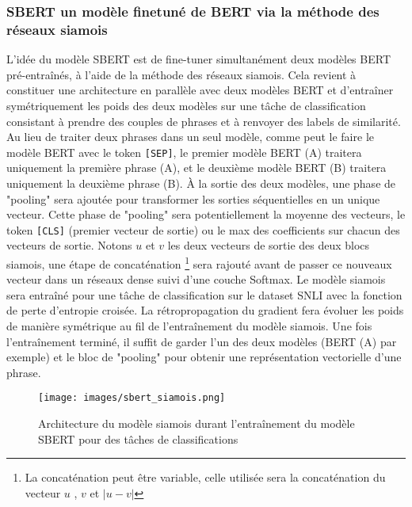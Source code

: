 \documentclass[12pt]{article}
\theoremstyle{definition}
\begin{document}
\subsubsection{SBERT un modèle finetuné de BERT via la méthode des réseaux siamois}
L’idée du modèle SBERT est de fine-tuner simultanément deux modèles BERT pré-entraînés, à l’aide de la méthode des réseaux siamois. Cela revient à constituer une architecture en parallèle avec deux modèles BERT et d'entraîner symétriquement les poids des deux modèles sur une tâche de classification consistant à prendre des couples de phrases et à renvoyer des labels de similarité. Au lieu de traiter deux phrases dans un seul modèle, comme peut le faire le modèle BERT avec le token \texttt{[SEP]}, le premier modèle BERT (A) traitera uniquement la première phrase (A), et le deuxième modèle BERT (B) traitera uniquement la deuxième phrase (B). À la sortie des deux modèles, une phase de "pooling" sera ajoutée pour transformer les sorties séquentielles en un unique vecteur. Cette phase de "pooling" sera potentiellement la moyenne des vecteurs, le token \texttt{[CLS]} (premier vecteur de sortie) ou le max des coefficients sur chacun des vecteurs de sortie. Notons $u$ et $v$ les deux vecteurs de sortie des deux blocs siamois, une étape de concaténation \footnote{La concaténation peut être variable, celle utilisée sera la concaténation du vecteur $u$ , $v$  et $|u-v|$ } sera rajouté avant de passer ce nouveaux vecteur dans un réseaux dense suivi d'une couche Softmax. Le modèle siamois sera entraîné pour une tâche de classification sur le dataset SNLI \cite{sts} avec la fonction de perte d'entropie croisée. La rétropropagation du gradient fera évoluer les poids de manière symétrique au fil de l’entraînement du modèle siamois. Une fois l’entraînement terminé, il suffit de garder l’un des deux modèles (BERT (A) par exemple) et le bloc de "pooling" pour obtenir une représentation vectorielle d'une phrase.

\begin{figure*}[!h]
	\centering
	\texttt{[image: images/sbert\_siamois.png]}
	\caption{Architecture du modèle siamois durant l'entraînement du modèle SBERT pour des tâches de classifications \cite{sbert}}
\end{figure*}
\end{document}
